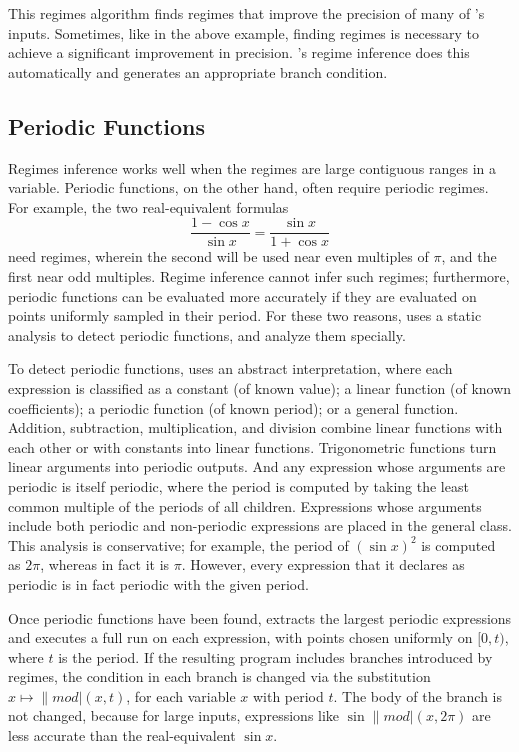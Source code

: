 \documentclass[paper.tex]{subfiles}
\begin{document}
This regimes algorithm finds regimes that improve
  the precision of many of \casio's inputs.
Sometimes, like in the above example,
  finding regimes is necessary to achieve
  a significant improvement in precision.
\casio's regime inference does this automatically
  and generates an appropriate branch condition.

\subsection{Periodic Functions}

Regimes inference works well when the regimes
  are large contiguous ranges in a variable.
Periodic functions, on the other hand, often require periodic regimes.
For example, the two real-equivalent formulas
\[
\frac{1 - \cos x}{\sin x} = \frac{\sin x}{1 + \cos x}
\]
  need regimes, wherein the second will be used
  near even multiples of $\pi$, and the first near odd multiples.
Regime inference cannot infer such regimes; furthermore,
  periodic functions can be evaluated more accurately
  if they are evaluated on points uniformly sampled in their period.
For these two reasons, \casio uses a static analysis
  to detect periodic functions, and analyze them specially.

To detect periodic functions, \casio uses an abstract interpretation,
  where each expression is classified as
  a constant (of known value); a linear function (of known coefficients);
  a periodic function (of known period); or a general function.
Addition, subtraction, multiplication, and division
  combine linear functions with each other or with constants
  into linear functions.
Trigonometric functions turn linear arguments
  into periodic outputs.
And any expression whose arguments are periodic
  is itself periodic, where the period is computed
  by taking the least common multiple of the periods of all children.
Expressions whose arguments include
  both periodic and non-periodic expressions
  are placed in the general class.
This analysis is conservative; for example, the period of $(\sin x)^2$
  is computed as $2 \pi$, whereas in fact it is $\pi$.
However, every expression that it declares as periodic
  is in fact periodic with the given period.

Once periodic functions have been found,
  \casio extracts the largest periodic expressions
  and executes a full \casio run on each expression,
  with points chosen uniformly on $[0, t)$,
  where $t$ is the period.
If the resulting program includes branches introduced by regimes,
  the condition in each branch is changed via the substitution
  $x \mapsto \|mod|(x, t)$, for each variable $x$ with period $t$.
The body of the branch is not changed,
  because for large inputs, expressions like
  $\sin \|mod|(x, 2\pi)$
  are less accurate than the real-equivalent $\sin x$.
\end{document}
